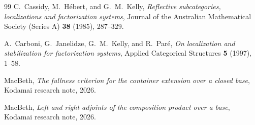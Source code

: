 \documentclass[11pt]{amsart}
\theoremstyle{plain}
\theoremstyle{definition}
\begin{document}
\begin{thebibliography}{99}
C.~Cassidy, M.~H\'ebert, and G.~M.~Kelly,
\emph{Reflective subcategories, localizations and factorization systems},
Journal of the Australian Mathematical Society (Series A) \textbf{38} (1985), 287--329.

A.~Carboni, G.~Janelidze, G.~M.~Kelly, and R.~Par\'e,
\emph{On localization and stabilization for factorization systems},
Applied Categorical Structures \textbf{5} (1997), 1--58.

MacBeth,
\emph{The fullness criterion for the container extension over a closed base},
Kodamai research note, 2026.

MacBeth,
\emph{Left and right adjoints of the composition product over a base},
Kodamai research note, 2026.

\end{thebibliography}
\end{document}
